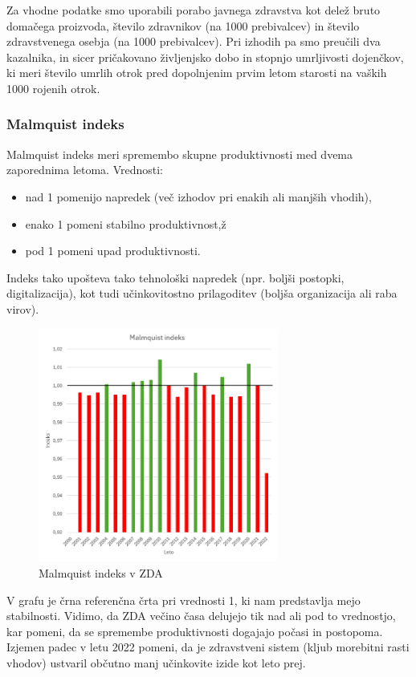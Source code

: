 \documentclass[12pt,a4paper]{article}
\theoremstyle{definition}
\begin{document}
Za vhodne podatke smo uporabili porabo javnega zdravstva kot delež bruto domačega proizvoda, 
število zdravnikov (na 1000 prebivalcev) in število zdravstvenega osebja (na 1000 prebivalcev). 
Pri izhodih pa smo preučili dva kazalnika, in sicer pričakovano življenjsko dobo in stopnjo umrljivosti dojenčkov, 
ki meri število umrlih otrok pred dopolnjenim prvim letom starosti na vaških 1000 rojenih otrok.

\subsubsection{Malmquist indeks}

Malmquist indeks meri spremembo skupne produktivnosti med dvema zaporednima letoma. Vrednosti:
\begin{itemize}
    \item nad 1 pomenijo napredek (več izhodov pri enakih ali manjših vhodih),
    \item enako 1 pomeni stabilno produktivnost,ž
    \item pod 1 pomeni upad produktivnosti.
\end{itemize}
Indeks tako upošteva tako tehnološki napredek (npr. boljši postopki, digitalizacija),
kot tudi učinkovitostno prilagoditev (boljša organizacija ali raba virov).

\begin{figure}[htbp]
    \centering
    \includegraphics[width=0.7\textwidth]{zda_malmquist_indeks.png}
    \caption{Malmquist indeks v ZDA}
    \label{fig:zda_malmquist_indeks}
\end{figure}

V grafu je črna referenčna črta pri vrednosti 1, ki nam predstavlja mejo stabilnosti. 
Vidimo, da ZDA večino časa delujejo tik nad ali pod to vrednostjo, kar pomeni, 
da se spremembe produktivnosti dogajajo počasi in postopoma. 
Izjemen padec v letu 2022 pomeni, da je zdravstveni sistem (kljub morebitni rasti vhodov) 
ustvaril občutno manj učinkovite izide kot leto prej.

\nocite*{}


\end{document}
